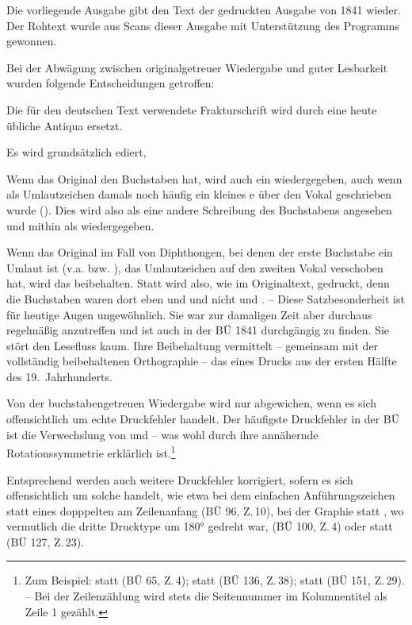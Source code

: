 {
Die vorliegende Ausgabe gibt den Text der gedruckten Ausgabe von 1841 wieder. Der Rohtext wurde aus Scans dieser Ausgabe mit Unterstützung des Programms  gewonnen.\par
Bei der Abwägung zwischen originalgetreuer Wiedergabe und guter Lesbarkeit wurden folgende Entscheidungen getroffen:
\begin{aufza}
\item Die für den deutschen Text verwendete Frakturschrift wird durch eine heute übliche Antiqua ersetzt.
\item Es wird grundsätzlich  ediert, \dh
	\begin{aufzb}
	\item Wenn das Original den Buchstaben  hat, wird auch ein  wiedergegeben, auch wenn als Umlautzeichen damals noch häufig ein kleines e über den Vokal geschrieben wurde (). Dies wird also als eine andere Schreibung des Buchstabens  angesehen und mithin als  wiedergegeben. 
	\item Wenn das Original im Fall von Diphthongen, bei denen der erste Buchstabe ein Umlaut ist (v.a.  bzw. ), das Umlautzeichen auf den zweiten Vokal verschoben hat, wird das beibehalten. Statt  wird also, wie im Originaltext,  gedruckt, denn die Buchstaben waren dort eben  und  und nicht  und . -- Diese Satzbesonderheit ist für heutige Augen ungewöhnlich. Sie war zur damaligen Zeit aber durchaus regelmäßig anzutreffen und ist auch in der BÜ 1841 durchgängig zu finden. Sie stört den Lesefluss kaum. Ihre Beibehaltung vermittelt  -- gemeinsam mit der vollständig beibehaltenen Orthographie -- das  eines Drucks aus der ersten Hälfte des 19.~Jahrhunderts. 
	\end{aufzb}
\item Von der buchstabengetreuen Wiedergabe wird nur abgewichen, wenn es sich offensichtlich um echte Druckfehler handelt. Der häufigste Druckfehler in der BÜ ist die Verwechslung von  und  -- was wohl durch ihre annähernde Rotationssymmetrie erklärlich ist.\footnote{%
	Zum Beispiel:  statt  (BÜ 65, Z.\,4);  statt  (BÜ 136, Z.\,38);  statt  (BÜ 151, Z.\,29). -- Bei der Zeilenzählung wird stets die Seitennummer im Kolumnentitel als Zeile 1 gezählt.}
\item Entsprechend werden auch weitere Druckfehler korrigiert, sofern es sich offensichtlich um solche handelt, wie etwa bei dem einfachen Anführungszeichen statt eines dopppelten am Zeilenanfang (BÜ 96, Z.\,10), bei der Graphie \fbox{,\grq ,} statt \fbox{,\grqq }, wo vermutlich die dritte Drucktype um 180° gedreht war, (BÜ 100, Z.\,4) oder  statt  (BÜ 127, Z.\,23).

\end{aufza}}
